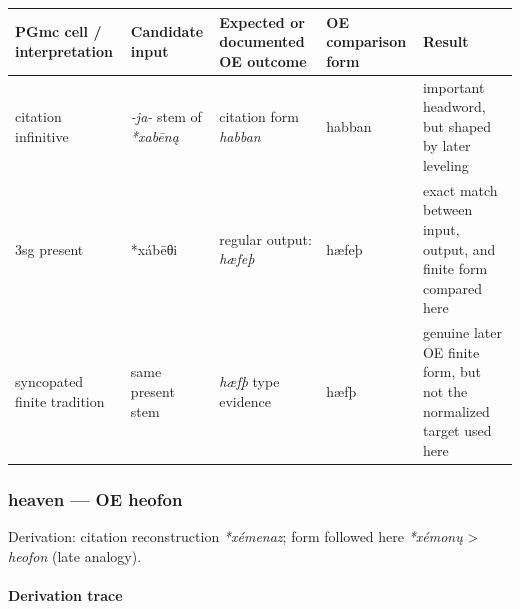 \documentclass[
  british,
  a4paper,
]{article}
\newcounter{none} %
\begin{document}
{\def\LTcaptype{none} %
\begin{longtable}[]{@{}
  >{\raggedright\arraybackslash}p{}
  >{\raggedright\arraybackslash}p{}
  >{\raggedright\arraybackslash}p{}
  >{\raggedright\arraybackslash}p{}
  >{\raggedright\arraybackslash}p{}@{}}
\toprule\noalign{}
\begin{minipage}[b]{\linewidth}\raggedright
PGmc cell / interpretation
\end{minipage} & \begin{minipage}[b]{\linewidth}\raggedright
Candidate input
\end{minipage} & \begin{minipage}[b]{\linewidth}\raggedright
Expected or documented OE outcome
\end{minipage} & \begin{minipage}[b]{\linewidth}\raggedright
OE comparison form
\end{minipage} & \begin{minipage}[b]{\linewidth}\raggedright
Result
\end{minipage} \\
\midrule\noalign{}
\endhead
\bottomrule\noalign{}
\endlastfoot
citation infinitive & \emph{-ja-} stem of \emph{*xabēną} & citation form
\emph{habban} & habban & important headword, but shaped by later
leveling \\
3sg present & *xábēθi & regular output: \emph{hæfeþ} & hæfeþ & exact
match between input, output, and finite form compared here \\
syncopated finite tradition & same present stem & \emph{hæfþ} type
evidence & hæfþ & genuine later OE finite form, but not the normalized
target used here \\
\end{longtable}
}

\subsubsection{heaven --- OE heofon}\label{heaven-oe-heofon}

Derivation: citation reconstruction \emph{*xémenaz}; form followed here
\emph{*xémonų} \textgreater{} \emph{heofon} (late analogy).

\paragraph{Derivation trace}\label{derivation-trace-47}
\end{document}
